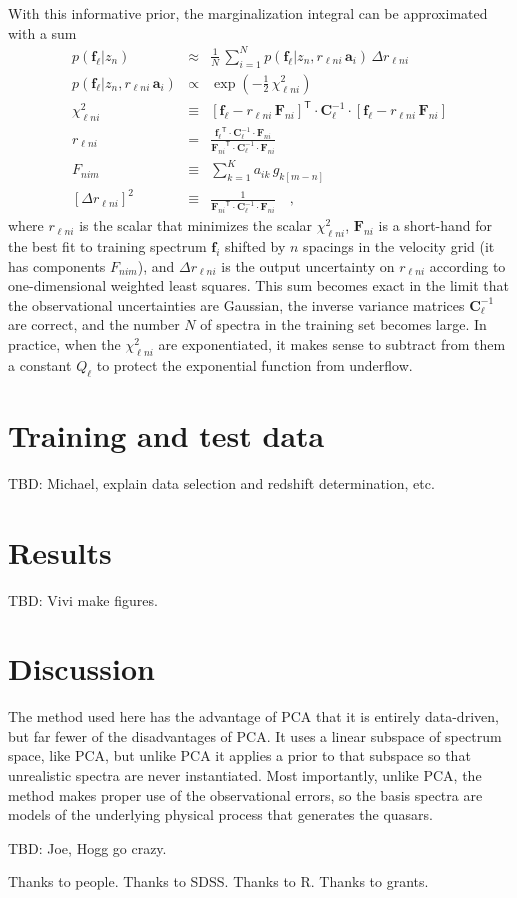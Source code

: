 \documentclass[preprint]{aastex}
\newcommand{\mmatrix}[1]{\boldsymbol{#1}}
\newcommand{\inverse}[1]{{#1}^{-1}}
\newcommand{\transpose}[1]{{#1}^{\mathsf{T}}}
\newcommand{\covar}{\mmatrix{C}}
\newcommand{\avec}{\mmatrix{a}}
\newcommand{\fvec}{\mmatrix{f}}
\newcommand{\Fvec}{\mmatrix{F}}
\newcommand{\invvar}{\inverse{\covar}}
\begin{document}
With this informative prior, the marginalization integral can be
approximated with a sum
\begin{eqnarray}\displaystyle
p(\fvec_\ell|z_n) &\approx& \frac{1}{N}\,\sum_{i=1}^N p(\fvec_\ell|z_n,r_{\ell ni}\,\avec_i)\,\Delta r_{\ell ni} \nonumber\\
p(\fvec_\ell|z_n,r_{\ell ni}\,\avec_i) &\propto& \exp(-\frac{1}{2}\,\chi^2_{\ell ni}) \nonumber\\
\chi^2_{\ell ni} &\equiv& \transpose{[\fvec_\ell - r_{\ell ni}\,\Fvec_{ni}]}\cdot\invvar_\ell\cdot[\fvec_\ell - r_{\ell ni}\,\Fvec_{ni}] \nonumber\\
r_{\ell ni} &=& \frac{\transpose{\fvec_\ell}\cdot\invvar_\ell\cdot\Fvec_{ni}}{\transpose{\Fvec_{ni}}\cdot\invvar_\ell\cdot\Fvec_{ni}} \nonumber\\
F_{nim} &\equiv& \sum_{k=1}^K a_{ik}\,g_{k[m-n]} \nonumber\\
{}[\Delta r_{\ell ni}]^2 &\equiv& \frac{1}{\transpose{\Fvec_{ni}}\cdot\invvar_\ell\cdot\Fvec_{ni}}
\quad ,
\end{eqnarray}
where $r_{\ell ni}$ is the scalar that minimizes the scalar
$\chi^2_{\ell ni}$, $\Fvec_{ni}$ is a short-hand for the best fit to
training spectrum $\fvec_i$ shifted by $n$ spacings in the velocity
grid (it has components $F_{nim}$), and $\Delta r_{\ell ni}$ is the
output uncertainty on $r_{\ell ni}$ according to one-dimensional
weighted least squares.  This sum becomes exact in the limit that the
observational uncertainties are Gaussian, the inverse variance
matrices $\invvar_\ell$ are correct, and the number $N$ of spectra in
the training set becomes large.  In practice, when the $\chi^2_{\ell n
  i}$ are exponentiated, it makes sense to subtract from them a
constant $Q_\ell$ to protect the exponential function from underflow.

\section{Training and test data}

TBD:  Michael, explain data selection and redshift determination, etc.

\section{Results}

TBD:  Vivi make figures.

\section{Discussion}

The method used here has the advantage of PCA that it is entirely
data-driven, but far fewer of the disadvantages of PCA.  It uses a
linear subspace of spectrum space, like PCA, but unlike PCA it applies
a prior to that subspace so that unrealistic spectra are never
instantiated.  Most importantly, unlike PCA, the method makes proper
use of the observational errors, so the basis spectra are models of
the underlying physical process that generates the quasars.

TBD:  Joe, Hogg go crazy.

\acknowledgements
Thanks to people.  Thanks to SDSS.  Thanks to R.  Thanks to grants.
\end{document}
